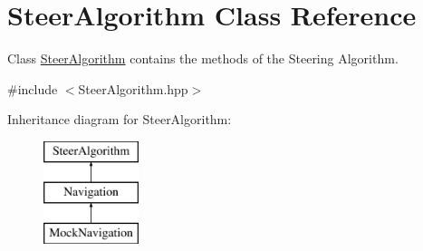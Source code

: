 \hypertarget{class_steer_algorithm}{}\section{Steer\+Algorithm Class Reference}
\label{class_steer_algorithm}


Class \hyperlink{class_steer_algorithm}{Steer\+Algorithm} contains the methods of the Steering Algorithm.  




{\ttfamily \#include $<$Steer\+Algorithm.\+hpp$>$}

Inheritance diagram for Steer\+Algorithm\+:\begin{figure}[H]
\begin{center}
\leavevmode
\includegraphics[height=3.000000cm]{class_steer_algorithm}
\end{center}
\end{figure}
